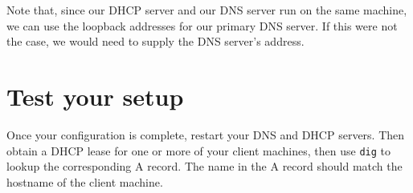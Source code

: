 \documentclass{article}
\begin{document}
Note that, since our DHCP server and our DNS server run on the same machine, we can use the loopback 
addresses for our primary DNS server.  If this were not the case, we would need to supply the 
DNS server's address.

\section{Test your setup}
Once your configuration is complete, restart your DNS and DHCP servers. Then obtain a DHCP lease for one or more of your client machines, then use \texttt{dig} to lookup the corresponding A record.  The name in the A record should match the hostname of the client machine.
\end{document}

